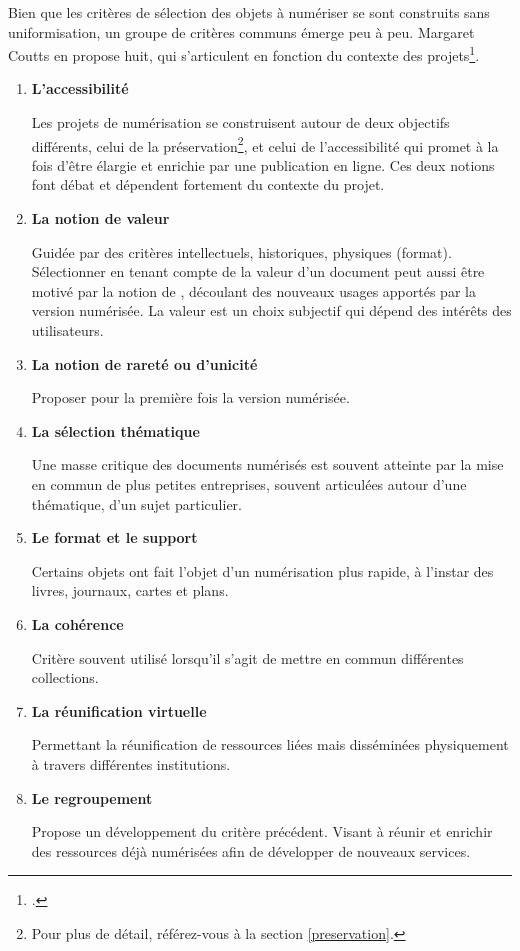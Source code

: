 Bien que les critères de sélection des objets à numériser se sont construits sans uniformisation, un groupe de critères communs émerge peu à peu. Margaret Coutts en propose huit, qui s'articulent en fonction du contexte des projets\footcite{coutts_stepping_2017}.
\begin{enumerate}
\item \textbf{L'accessibilité}

Les projets de numérisation se construisent autour de deux objectifs différents, celui de la préservation\footnote{Pour plus de détail, référez-vous à la section \ref{preservation}.}, et celui de l'accessibilité qui promet à la fois d'être élargie et enrichie par une publication en ligne. Ces deux notions font débat et dépendent fortement du contexte du projet.
\item \textbf{La notion de valeur}

Guidée par des critères intellectuels, historiques, physiques (format). Sélectionner en tenant compte de la valeur d'un document peut aussi être motivé par la notion de , découlant des nouveaux usages apportés par la version numérisée. La valeur est un choix subjectif qui dépend des intérêts des utilisateurs.

\item \textbf{La notion de rareté ou d'unicité}

Proposer pour la première fois la version numérisée. 

\item \textbf{La sélection thématique}

Une masse critique des documents numérisés est souvent atteinte par la mise en commun de plus petites entreprises, souvent articulées autour d'une thématique, d'un sujet particulier.

\item \textbf{Le format et le support}

Certains objets ont fait l'objet d'un numérisation plus rapide, à l'instar des livres, journaux, cartes et plans. 

\item \textbf{La cohérence}

Critère souvent utilisé lorsqu'il s'agit de mettre en commun différentes collections.

\item \textbf{La réunification virtuelle}

Permettant la réunification de ressources liées mais disséminées physiquement à travers différentes institutions.

\item \textbf{Le regroupement}

Propose un développement du critère précédent. Visant à réunir et enrichir des ressources déjà numérisées afin de développer de nouveaux services.

\end{enumerate}

